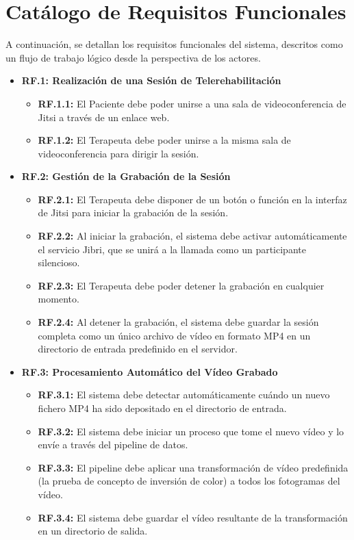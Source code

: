 \section{Catálogo de Requisitos Funcionales}
\label{sec:requisitos_funcionales}
A continuación, se detallan los requisitos funcionales del sistema, descritos como un flujo de trabajo lógico desde la perspectiva de los actores.

\begin{itemize}
	\item \textbf{RF.1: Realización de una Sesión de Telerehabilitación}
	\begin{itemize}
	    \item \textbf{RF.1.1:} El Paciente debe poder unirse a una sala de videoconferencia de Jitsi a través de un enlace web.
	    \item \textbf{RF.1.2:} El Terapeuta debe poder unirse a la misma sala de videoconferencia para dirigir la sesión.
	\end{itemize}
	
	\item \textbf{RF.2: Gestión de la Grabación de la Sesión}
	\begin{itemize}
	    \item \textbf{RF.2.1:} El Terapeuta debe disponer de un botón o función en la interfaz de Jitsi para iniciar la grabación de la sesión.
	    \item \textbf{RF.2.2:} Al iniciar la grabación, el sistema debe activar automáticamente el servicio Jibri, que se unirá a la llamada como un participante silencioso.
	    \item \textbf{RF.2.3:} El Terapeuta debe poder detener la grabación en cualquier momento.
        \item \textbf{RF.2.4:} Al detener la grabación, el sistema debe guardar la sesión completa como un único archivo de vídeo en formato MP4 en un directorio de entrada predefinido en el servidor.
	\end{itemize}
	
	\item \textbf{RF.3: Procesamiento Automático del Vídeo Grabado}
	\begin{itemize}
	    \item \textbf{RF.3.1:} El sistema debe detectar automáticamente cuándo un nuevo fichero MP4 ha sido depositado en el directorio de entrada.
	    \item \textbf{RF.3.2:} El sistema debe iniciar un proceso que tome el nuevo vídeo y lo envíe a través del pipeline de datos.
	    \item \textbf{RF.3.3:} El pipeline debe aplicar una transformación de vídeo predefinida (la prueba de concepto de inversión de color) a todos los fotogramas del vídeo.
	    \item \textbf{RF.3.4:} El sistema debe guardar el vídeo resultante de la transformación en un directorio de salida.
	\end{itemize}
	

\end{itemize}
